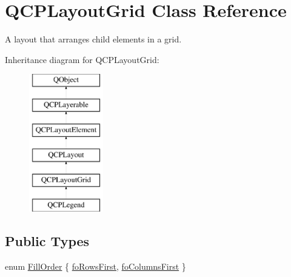 \hypertarget{class_q_c_p_layout_grid}{}\section{Q\+C\+P\+Layout\+Grid Class Reference}
\label{class_q_c_p_layout_grid}


A layout that arranges child elements in a grid.  


Inheritance diagram for Q\+C\+P\+Layout\+Grid\+:\begin{figure}[H]
\begin{center}
\leavevmode
\includegraphics[height=6.000000cm]{class_q_c_p_layout_grid}
\end{center}
\end{figure}
\subsection*{Public Types}
\begin{DoxyCompactItemize}
\item 
enum \hyperlink{class_q_c_p_layout_grid_a7d49ee08773de6b2fd246edfed353cca}{Fill\+Order} \{ \hyperlink{class_q_c_p_layout_grid_a7d49ee08773de6b2fd246edfed353ccaa0202730954e26c474cc820164aedce3e}{fo\+Rows\+First}, 
\hyperlink{class_q_c_p_layout_grid_a7d49ee08773de6b2fd246edfed353ccaac4cb4b796ec4822d5894b47b51627fb3}{fo\+Columns\+First}
 \}
\end{DoxyCompactItemize}
